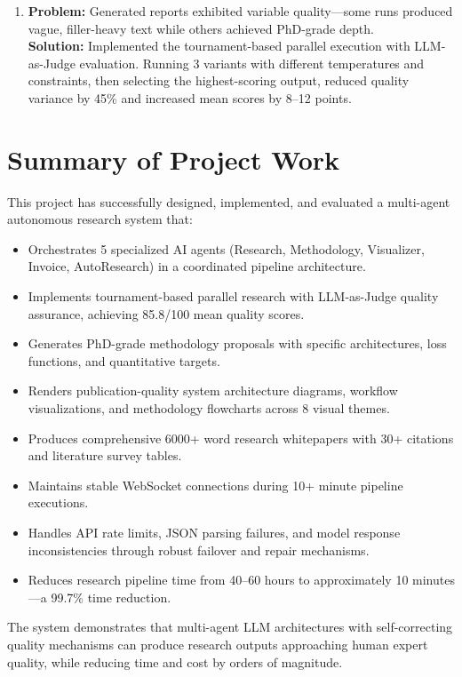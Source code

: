 \begin{enumerate}[label=\arabic*., leftmargin=2cm]
\item \textbf{Problem:} Generated reports exhibited variable quality---some runs produced vague, filler-heavy text while others achieved PhD-grade depth.\\
\textbf{Solution:} Implemented the tournament-based parallel execution with LLM-as-Judge evaluation. Running 3 variants with different temperatures and constraints, then selecting the highest-scoring output, reduced quality variance by 45\% and increased mean scores by 8--12 points.
\end{enumerate}

\section{Summary of Project Work}

This project has successfully designed, implemented, and evaluated a multi-agent autonomous research system that:

\begin{itemize}[leftmargin=2cm]
\item Orchestrates 5 specialized AI agents (Research, Methodology, Visualizer, Invoice, AutoResearch) in a coordinated pipeline architecture.
\item Implements tournament-based parallel research with LLM-as-Judge quality assurance, achieving 85.8/100 mean quality scores.
\item Generates PhD-grade methodology proposals with specific architectures, loss functions, and quantitative targets.
\item Renders publication-quality system architecture diagrams, workflow visualizations, and methodology flowcharts across 8 visual themes.
\item Produces comprehensive 6000+ word research whitepapers with 30+ citations and literature survey tables.
\item Maintains stable WebSocket connections during 10+ minute pipeline executions.
\item Handles API rate limits, JSON parsing failures, and model response inconsistencies through robust failover and repair mechanisms.
\item Reduces research pipeline time from 40--60 hours to approximately 10 minutes---a 99.7\% time reduction.
\end{itemize}

The system demonstrates that multi-agent LLM architectures with self-correcting quality mechanisms can produce research outputs approaching human expert quality, while reducing time and cost by orders of magnitude.

